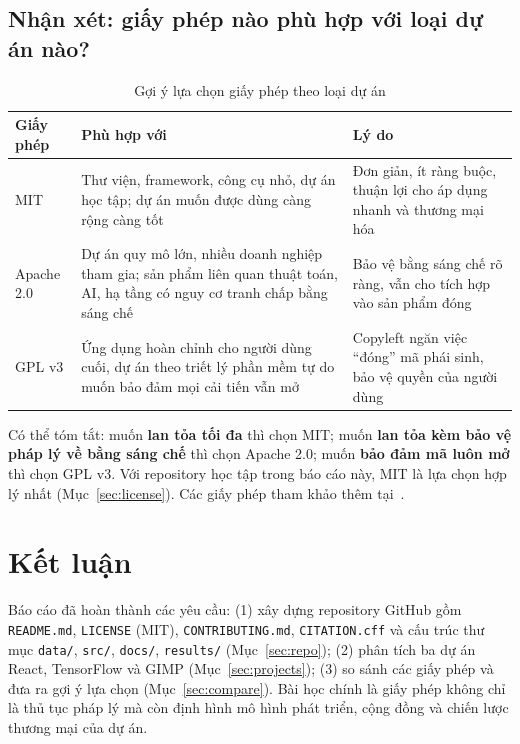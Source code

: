 \documentclass[12pt,a4paper]{article}
\newcommand{\fn}[1]{\texttt{#1}}
\begin{document}
\subsection{Nhận xét: giấy phép nào phù hợp với loại dự án nào?}
\begin{table}[htbp]
\centering
\caption{Gợi ý lựa chọn giấy phép theo loại dự án}\label{tab:choose}
\renewcommand{\arraystretch}{1.25}
\begin{tabularx}{\textwidth}{@{}l X X@{}}
\toprule
\textbf{Giấy phép} & \textbf{Phù hợp với} & \textbf{Lý do}\\\midrule
MIT & Thư viện, framework, công cụ nhỏ, dự án học tập; dự án muốn được dùng càng rộng càng tốt & Đơn giản, ít ràng buộc, thuận lợi cho áp dụng nhanh và thương mại hóa\\
Apache 2.0 & Dự án quy mô lớn, nhiều doanh nghiệp tham gia; sản phẩm liên quan thuật toán, AI, hạ tầng có nguy cơ tranh chấp bằng sáng chế & Bảo vệ bằng sáng chế rõ ràng, vẫn cho tích hợp vào sản phẩm đóng\\
GPL v3 & Ứng dụng hoàn chỉnh cho người dùng cuối, dự án theo triết lý phần mềm tự do muốn bảo đảm mọi cải tiến vẫn mở & Copyleft ngăn việc ``đóng'' mã phái sinh, bảo vệ quyền của người dùng\\\bottomrule
\end{tabularx}
\end{table}

Có thể tóm tắt: muốn \textbf{lan tỏa tối đa} thì chọn MIT; muốn \textbf{lan tỏa kèm bảo vệ pháp lý về bằng sáng chế} thì chọn Apache 2.0; muốn \textbf{bảo đảm mã luôn mở} thì chọn GPL v3. Với repository học tập trong báo cáo này, MIT là lựa chọn hợp lý nhất (Mục~\ref{sec:license}). Các giấy phép tham khảo thêm tại~\cite{choose,spdx}.

\section{Kết luận}\label{sec:conclusion}
Báo cáo đã hoàn thành các yêu cầu: (1) xây dựng repository GitHub gồm \fn{README.md}, \fn{LICENSE} (MIT), \fn{CONTRIBUTING.md}, \fn{CITATION.cff} và cấu trúc thư mục \fn{data/}, \fn{src/}, \fn{docs/}, \fn{results/} (Mục~\ref{sec:repo}); (2) phân tích ba dự án React, TensorFlow và GIMP (Mục~\ref{sec:projects}); (3) so sánh các giấy phép và đưa ra gợi ý lựa chọn (Mục~\ref{sec:compare}). Bài học chính là giấy phép không chỉ là thủ tục pháp lý mà còn định hình mô hình phát triển, cộng đồng và chiến lược thương mại của dự án.
\end{document}
